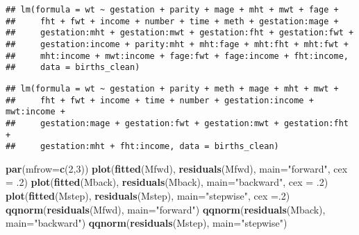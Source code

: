 \documentclass[]{article}
\newenvironment{Shaded}{\begin{snugshade}}{\end{snugshade}}
\newcommand{\KeywordTok}[1]{\textcolor[rgb]{0.13,0.29,0.53}{\textbf{#1}}}
\newcommand{\DataTypeTok}[1]{\textcolor[rgb]{0.13,0.29,0.53}{#1}}
\newcommand{\DecValTok}[1]{\textcolor[rgb]{0.00,0.00,0.81}{#1}}
\newcommand{\StringTok}[1]{\textcolor[rgb]{0.31,0.60,0.02}{#1}}
\newcommand{\OperatorTok}[1]{\textcolor[rgb]{0.81,0.36,0.00}{\textbf{#1}}}
\newcommand{\NormalTok}[1]{#1}
\begin{document}
\begin{Shaded}
\end{Shaded}

\begin{verbatim}
## lm(formula = wt ~ gestation + parity + mage + mht + mwt + fage + 
##     fht + fwt + income + number + time + meth + gestation:mage + 
##     gestation:mht + gestation:mwt + gestation:fht + gestation:fwt + 
##     gestation:income + parity:mht + mht:fage + mht:fht + mht:fwt + 
##     mht:income + mwt:income + fage:fwt + fage:income + fht:income, 
##     data = births_clean)
\end{verbatim}

\begin{Shaded}
\end{Shaded}

\begin{verbatim}
## lm(formula = wt ~ gestation + parity + meth + mage + mht + mwt + 
##     fht + fwt + income + time + number + gestation:income + mwt:income + 
##     gestation:mage + gestation:fwt + gestation:mwt + gestation:fht + 
##     gestation:mht + fht:income, data = births_clean)
\end{verbatim}

\begin{Shaded}
\begin{Highlighting}[]
\KeywordTok{par}\NormalTok{(}\DataTypeTok{mfrow=}\KeywordTok{c}\NormalTok{(}\DecValTok{2}\NormalTok{,}\DecValTok{3}\NormalTok{))}
\KeywordTok{plot}\NormalTok{(}\KeywordTok{fitted}\NormalTok{(Mfwd), }\KeywordTok{residuals}\NormalTok{(Mfwd), }\DataTypeTok{main=}\StringTok{"forward"}\NormalTok{, }\DataTypeTok{cex =}\NormalTok{ .}\DecValTok{2}\NormalTok{)}
\KeywordTok{plot}\NormalTok{(}\KeywordTok{fitted}\NormalTok{(Mback), }\KeywordTok{residuals}\NormalTok{(Mback), }\DataTypeTok{main=}\StringTok{"backward"}\NormalTok{, }\DataTypeTok{cex =}\NormalTok{ .}\DecValTok{2}\NormalTok{)}
\KeywordTok{plot}\NormalTok{(}\KeywordTok{fitted}\NormalTok{(Mstep), }\KeywordTok{residuals}\NormalTok{(Mstep), }\DataTypeTok{main=}\StringTok{"stepwise"}\NormalTok{, }\DataTypeTok{cex =}\NormalTok{.}\DecValTok{2}\NormalTok{)}
\KeywordTok{qqnorm}\NormalTok{(}\KeywordTok{residuals}\NormalTok{(Mfwd), }\DataTypeTok{main=}\StringTok{"forward"}\NormalTok{)}
\KeywordTok{qqnorm}\NormalTok{(}\KeywordTok{residuals}\NormalTok{(Mback), }\DataTypeTok{main=}\StringTok{"backward"}\NormalTok{)}
\KeywordTok{qqnorm}\NormalTok{(}\KeywordTok{residuals}\NormalTok{(Mstep), }\DataTypeTok{main=}\StringTok{"stepwise"}\NormalTok{)}
\end{Highlighting}
\end{Shaded}
\end{document}
